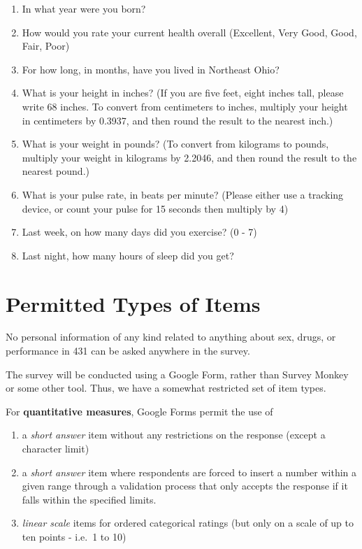 \documentclass[]{book}
\providecommand{\tightlist}{%
  \setlength{\itemsep}{0pt}\setlength{\parskip}{0pt}}
\begin{document}
\begin{enumerate}
\def\labelenumi{\arabic{enumi}.}
\setcounter{enumi}{7}
\tightlist
\item
  In what year were you born?
\item
  How would you rate your current health overall (Excellent, Very Good, Good, Fair, Poor)
\item
  For how long, in months, have you lived in Northeast Ohio?
\item
  What is your height in inches? (If you are five feet, eight inches tall, please write 68 inches. To convert from centimeters to inches, multiply your height in centimeters by 0.3937, and then round the result to the nearest inch.)
\item
  What is your weight in pounds? (To convert from kilograms to pounds, multiply your weight in kilograms by 2.2046, and then round the result to the nearest pound.)
\item
  What is your pulse rate, in beats per minute? (Please either use a tracking device, or count your pulse for 15 seconds then multiply by 4)
\item
  Last week, on how many days did you exercise? (0 - 7)
\item
  Last night, how many hours of sleep did you get?
\end{enumerate}

\hypertarget{permitted-types-of-items}{%
\section{Permitted Types of Items}\label{permitted-types-of-items}}

No personal information of any kind related to anything about sex, drugs, or performance in 431 can be asked anywhere in the survey.

The survey will be conducted using a Google Form, rather than Survey Monkey or some other tool. Thus, we have a somewhat restricted set of item types.

For \textbf{quantitative measures}, Google Forms permit the use of

\begin{enumerate}
\def\labelenumi{\arabic{enumi}.}
\tightlist
\item
  a \emph{short answer} item without any restrictions on the response (except a character limit)
\item
  a \emph{short answer} item where respondents are forced to insert a number within a given range through a validation process that only accepts the response if it falls within the specified limits.
\item
  \emph{linear scale} items for ordered categorical ratings (but only on a scale of up to ten points - i.e.~1 to 10)
\end{enumerate}
\end{document}
